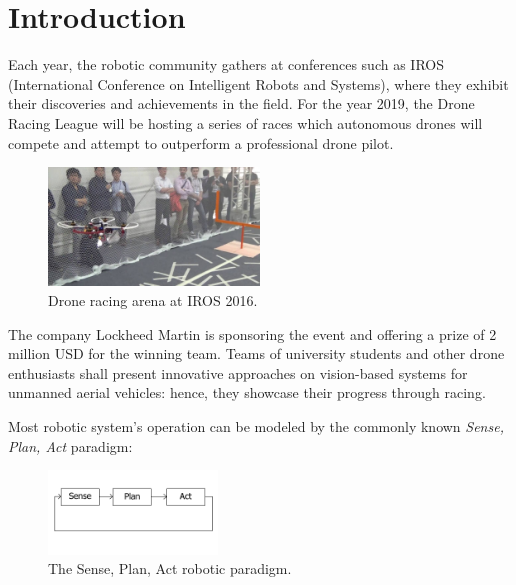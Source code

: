 \chapter{Introduction}

Each year, the robotic community gathers at conferences such as IROS
(International Conference on Intelligent Robots and Systems), where they
exhibit their discoveries and achievements in the field. For the year 2019, the
Drone Racing League will be hosting a series of races which autonomous drones
will compete and attempt to outperform a professional drone pilot.\\
\begin{figure}[h]
	\centering
	\includegraphics[width=0.5\textwidth]{figure/iros_2016.jpg}
	\caption{Drone racing arena at IROS 2016.}
	\label{fig:iros}
\end{figure}
The company Lockheed Martin is sponsoring the event and offering a prize of 2
million USD for the winning team. Teams of university students and other drone
enthusiasts shall present innovative approaches on vision-based systems for
unmanned aerial vehicles: hence, they showcase their progress through racing.\\



Most robotic system's operation can be modeled by the commonly known
\emph{Sense, Plan, Act} paradigm:
\begin{figure}[h]
	\centering
	\includegraphics[width=0.4\textwidth]{figure/robotic_paradigm.png}
	\caption{The Sense, Plan, Act robotic paradigm.}
	\label{fig:robotic_paradigm}
\end{figure}

